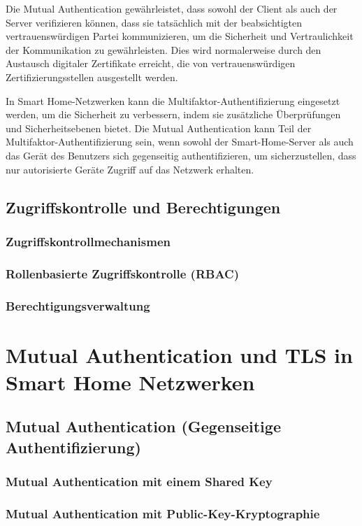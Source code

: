Die Mutual Authentication gewährleistet, dass sowohl der Client als auch der Server verifizieren können, dass sie tatsächlich mit der beabsichtigten vertrauenswürdigen Partei kommunizieren, um die Sicherheit und Vertraulichkeit der Kommunikation zu gewährleisten. Dies wird normalerweise durch den Austausch digitaler Zertifikate erreicht, die von vertrauenswürdigen Zertifizierungsstellen ausgestellt werden.

In Smart Home-Netzwerken kann die Multifaktor-Authentifizierung eingesetzt werden, um die Sicherheit zu verbessern, indem sie zusätzliche Überprüfungen und Sicherheitsebenen bietet. Die Mutual Authentication kann Teil der Multifaktor-Authentifizierung sein, wenn sowohl der Smart-Home-Server als auch das Gerät des Benutzers sich gegenseitig authentifizieren, um sicherzustellen, dass nur autorisierte Geräte Zugriff auf das Netzwerk erhalten.

\subsection{Zugriffskontrolle und Berechtigungen}
\subsubsection{Zugriffskontrollmechanismen}
\subsubsection{Rollenbasierte Zugriffskontrolle (RBAC)}
\subsubsection{Berechtigungsverwaltung}

\newpage
\section{Mutual Authentication und TLS in Smart Home Netzwerken}
\subsection{Mutual Authentication (Gegenseitige Authentifizierung)}
\subsubsection{Mutual Authentication mit einem Shared Key}
\subsubsection{Mutual Authentication mit Public-Key-Kryptographie}
